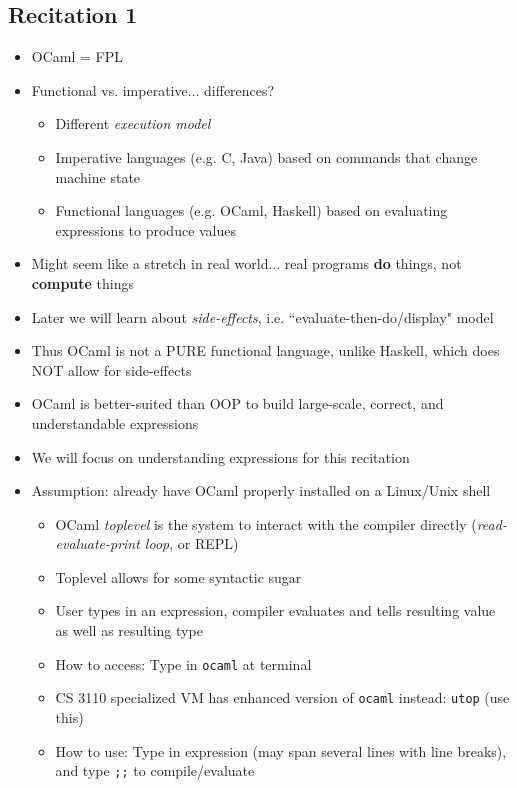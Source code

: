 \subsection*{Recitation 1}

\begin{itemize}
    \item \textsf{OCaml} = FPL
    \item Functional vs. imperative$\ldots$ differences?
    \begin{itemize}
        \item Different \textit{execution model}
        \item Imperative languages (e.g. \textsf{C}, \textsf{Java}) based on commands that change machine state
        \item Functional languages (e.g. \textsf{OCaml}, \textsf{Haskell}) based on evaluating expressions to produce values
    \end{itemize}
    \item Might seem like a stretch in real world$\ldots$ real programs \textbf{do} things, not \textbf{compute} things
    \item Later we will learn about \textit{side-effects}, i.e. ``evaluate-then-do/display" model
    \item Thus \textsf{OCaml} is not a PURE functional language, unlike \textsf{Haskell}, which does NOT allow for side-effects
    \item \textsf{OCaml} is better-suited than OOP to build large-scale, correct, and understandable expressions
    \item We will focus on understanding expressions for this recitation
    \item Assumption: already have \textsf{OCaml} properly installed on a Linux/Unix shell
    \begin{itemize}
        \item \textsf{OCaml} \textit{toplevel} is the system to interact with the compiler directly (\textit{read-evaluate-print loop}, or REPL)
        \item Toplevel allows for some syntactic sugar
        \item User types in an expression, compiler evaluates and tells resulting value as well as resulting type
        \item How to access: Type in \texttt{ocaml} at terminal
        \item CS 3110 specialized VM has enhanced version of \texttt{ocaml} instead: \texttt{utop} (use this)
        \item How to use: Type in expression (may span several lines with line breaks), and type \texttt{;;} to compile/evaluate

\end{itemize}
\end{itemize}
